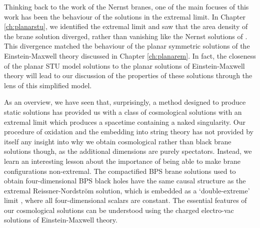 Thinking back to the work of the Nernst branes, one of the main focuses of this work has been the behaviour of the solutions in the extremal limit. In Chapter \ref{ch:planarstu}, we identified the extremal limit and saw that the area density of the brane solution diverged, rather than vanishing like the Nernst solutions of \cite{Dempster:2015}. This divergence matched the behaviour of the planar symmetric solutions of the Einstein-Maxwell theory discussed in Chapter \ref{ch:planarem}. In fact, the closeness of the planar STU model solutions to the planar solutions of Einstein-Maxwell theory will lead to our discussion of the properties of these solutions through the lens of this simplified model. 

As an overview, we have seen that, surprisingly, a method designed to produce static solutions has provided us with a class of cosmological solutions with an extremal limit which produces a spacetime containing a naked singularity. Our procedure of oxidation and the embedding into string theory has not provided by itself any insight into why we obtain cosmological rather than black brane solutions though, as the additional dimensions are purely spectators. Instead, we learn an interesting lesson about the importance of being able to make brane configurations non-extremal. The compactified BPS brane solutions used to obtain four-dimensional BPS black holes have the same causal structure as the extremal Reissner-Nordstr\"om solution, which is embedded as a `double-extreme' limit \cite{Ferrara:1997tw}, where all four-dimensional scalars are constant. The essential features of our cosmological solutions can be understood using the charged electro-vac solutions of Einstein-Maxwell theory.


